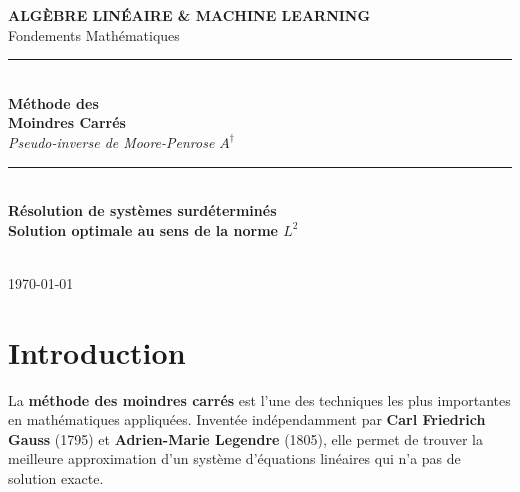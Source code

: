 \documentclass[12pt,a4paper]{article}
\begin{document}
\begin{titlepage}
    \centering
    \vspace*{1cm}

    {\Large\textbf{\textcolor{bleu}{ALGÈBRE LINÉAIRE \& MACHINE LEARNING}}}\\[0.3cm]
    {\large Fondements Mathématiques}\\[1.5cm]

    \noindent\rule{\textwidth}{2pt}\\[0.8cm]
    {\Huge\textbf{Méthode des}}\\[0.3cm]
    {\Huge\textbf{Moindres Carrés}}\\[0.5cm]
    {\Large\textit{Pseudo-inverse de Moore-Penrose $A^\dagger$}}\\[0.8cm]
    \noindent\rule{\textwidth}{2pt}\\[2cm]

    {\large\textbf{Résolution de systèmes surdéterminés}}\\[0.3cm]
    {\large\textbf{Solution optimale au sens de la norme $L^2$}}\\[3cm]

    \vfill

    \noindent{}\\[1.5cm]

    {\large\today}
\end{titlepage}

\tableofcontents
\newpage


\section{Introduction}

La \textbf{méthode des moindres carrés} est l'une des techniques les plus importantes en mathématiques appliquées. Inventée indépendamment par \textbf{Carl Friedrich Gauss} (1795) et \textbf{Adrien-Marie Legendre} (1805), elle permet de trouver la meilleure approximation d'un système d'équations linéaires qui n'a pas de solution exacte.
\end{document}
